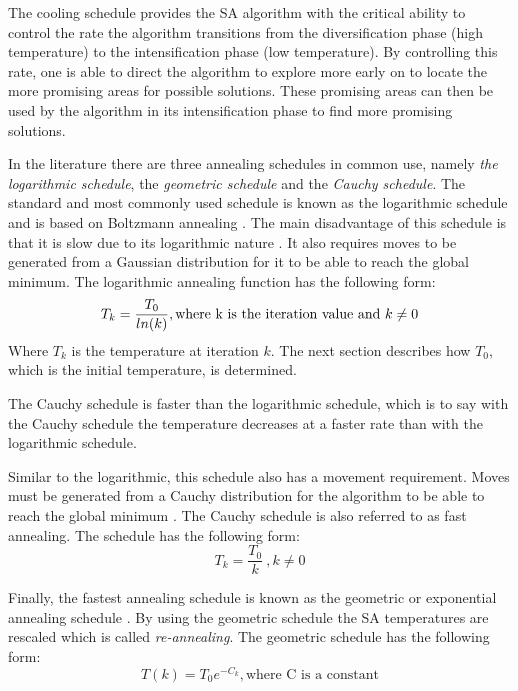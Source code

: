 The cooling schedule provides the \gls{SA} algorithm with the critical ability to control the rate the algorithm transitions from the diversification phase (high temperature) to the intensification phase (low temperature)\cite{ClusterSA}. By controlling this rate, one is able to direct the algorithm to explore more early on to locate the more promising areas for possible solutions. These promising areas can then be used by the algorithm in its intensification phase to find more promising solutions.

In the literature there are three annealing schedules in common use, namely \emph{the logarithmic schedule}, the \emph{geometric schedule} and the \emph{Cauchy schedule}\cite{VeryFastSAImageEnchancement,SASingleMultiObj}. 
The standard and most commonly used schedule is known as the logarithmic schedule and is based on Boltzmann annealing \cite{VeryFastSAImageEnchancement}. The main disadvantage of this schedule is that it is slow due to its logarithmic nature \cite{VeryFastSAImageEnchancement}. It also requires moves to be generated from a Gaussian distribution for it to be able to reach the global minimum\cite{SASingleMultiObj}. The logarithmic annealing function has the following form:
\begin{equation}
\label{eq:logcooling}
	T_k = \frac{T_0}{ln(k)},\text{where k is the iteration value and } k \neq 0\\
\end{equation}
Where $T_k$ is the temperature at iteration $k$. The next section describes how $T_0$, which is the initial temperature, is determined.

The Cauchy schedule is faster than the logarithmic schedule, which is to say with the Cauchy schedule the temperature decreases at a faster rate than with the logarithmic schedule. 

Similar to the logarithmic, this schedule also has a movement requirement. Moves must be generated from a Cauchy distribution for the algorithm to be able to reach the global minimum \cite{SASingleMultiObj,VeryFastSAImageEnchancement}. The Cauchy schedule is also referred to as fast annealing\cite{VeryFastSAImageEnchancement}. The schedule has the following form:
\begin{equation}
\label{eq:cauchycooling}
	T_k = \frac{T_0}{k} ~, k \neq 0
\end{equation}

Finally, the fastest annealing schedule is known as the geometric or exponential annealing schedule \cite{SASingleMultiObj}. By using the geometric schedule the \gls{SA} temperatures are rescaled which is called \emph{re-annealing}\cite{VeryFastSAImageEnchancement}.
The geometric schedule has the following form:
\begin{equation}
\label{eq:geocooling}
	T(k)=T_0e^{-C_k},\text{where C is a constant}
\end{equation}

